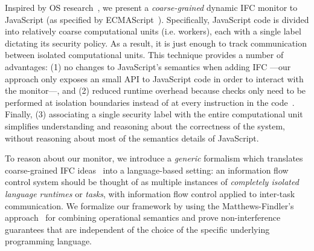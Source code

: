 Inspired by OS research~\cite{Zeldovich:2006}, we present a
\textit{coarse-grained} dynamic IFC monitor to JavaScript (as specified by
ECMAScript~\cite{ecma}). Specifically, JavaScript code is divided into relatively
coarse computational units (i.e. workers), each with a single label dictating
its security policy. As a result, it is just enough to track communication
between isolated computational units.
This technique provides a number of advantages: (1) no changes to JavaScript's
semantics when adding IFC ---our approach only exposes an small API to
JavaScript code in order to interact with the monitor---, and
(2) reduced runtime overhead because checks only need to be performed at isolation
boundaries instead of at every instruction in the code~\cite{JSFlow}.
Finally, (3) associating a single security label with the entire computational
unit simplifies understanding and reasoning about the correctness of the system,
without reasoning about most of the semantics details of JavaScript.

To reason about our monitor, we introduce a \emph{generic} formalism which
translates coarse-grained IFC ideas~\cite{Zeldovich:2006} into a language-based
setting: an information flow control system should be thought of as multiple
instances of \emph{completely isolated language runtimes} or \emph{tasks}, with
information flow control applied to inter-task communication.
We formalize our framework by using the Matthews-Findler's
approach~\cite{Matthews:2007:OSM:1190216.1190220} for combining operational
semantics and prove non-interference guarantees that are independent of the
choice of the specific underlying programming language. %

